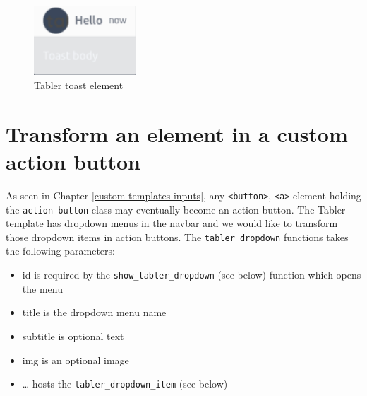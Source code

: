 \documentclass[
]{book}
\providecommand{\tightlist}{%
  \setlength{\itemsep}{0pt}\setlength{\parskip}{0pt}}
\begin{document}
\begin{figure}
\includegraphics[width=1.51in]{images/practice/tabler-toast} \caption{Tabler toast element}\label{fig:tabler-toast}
\end{figure}

\hypertarget{transform-an-element-in-a-custom-action-button}{%
\section{Transform an element in a custom action button}\label{transform-an-element-in-a-custom-action-button}}

As seen in Chapter \ref{custom-templates-inputs}, any \texttt{\textless{}button\textgreater{}}, \texttt{\textless{}a\textgreater{}} element holding the \texttt{action-button} class may eventually become an action button. The Tabler template has dropdown menus in the navbar and we would like to transform those dropdown items in action buttons. The \texttt{tabler\_dropdown} functions takes the following parameters:

\begin{itemize}
\tightlist
\item
  id is required by the \texttt{show\_tabler\_dropdown} (see below) function which opens the menu
\item
  title is the dropdown menu name
\item
  subtitle is optional text
\item
  img is an optional image
\item
  \ldots{} hosts the \texttt{tabler\_dropdown\_item} (see below)
\end{itemize}
\end{document}
